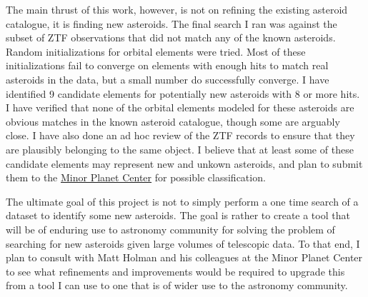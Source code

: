 The main thrust of this work, however, is not on refining the existing asteroid catalogue, it is finding new asteroids.
The final search I ran was against the subset of ZTF observations that did not match any of the known asteroids.
Random initializations for orbital elements were tried.
Most of these initializations fail to converge on elements with enough hits to match real asteroids in the data,
but a small number do successfully converge.
I have identified 9 candidate elements for potentially new asteroids with 8 or more hits.
I have verified that none of the orbital elements modeled for these asteroids 
are obvious matches in the known asteroid catalogue, though some are arguably close.
I have also done an ad hoc review of the ZTF records to ensure that they are plausibly belonging to the same object.
I believe that at least some of these candidate elements may represent new and unkown asteroids, and plan to submit them to the 
\href{https://www.minorplanetcenter.net/iau/mpc.html}{Minor Planet Center} for possible classification.

The ultimate goal of this project is not to simply perform a one time search of a dataset to identify some new asteroids.
The goal is rather to create a tool that will be of enduring use to astronomy community for solving the problem of 
searching for new asteroids given large volumes of telescopic data.
To that end, I plan to consult with Matt Holman and his colleagues at the Minor Planet Center to see what refinements and improvements
would be required to upgrade this from a tool I can use to one that is of wider use to the astronomy community.

